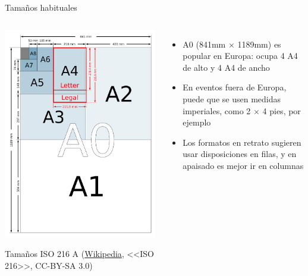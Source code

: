 \documentclass[xcolor=svgnames,compress]{beamer}
\begin{document}
\begin{frame}{Tamaños habituales}
  \begin{columns}

    \begin{center}
      \includegraphics[width=\textwidth,height=.7\textheight,keepaspectratio]{A_size_illustration2_with_letter_and_legal}

      Tamaños ISO 216 A (\href{http://en.wikipedia.org/wiki/File:A_size_illustration2.svg}{Wikipedia}, <<ISO 216>>, CC-BY-SA 3.0)
    \end{center}

    \begin{itemize}
    \item A0 (841mm $\times$ 1189mm) es popular en Europa: ocupa 4 A4
      de alto y 4 A4 de ancho
    \item En eventos fuera de Europa, puede que se usen medidas
      imperiales, como 2 $\times$ 4 pies, por ejemplo
    \item Los formatos en retrato sugieren usar disposiciones en
      filas, y en apaisado es mejor ir en columnas
    \end{itemize}
  \end{columns}
\end{frame}
\end{document}
